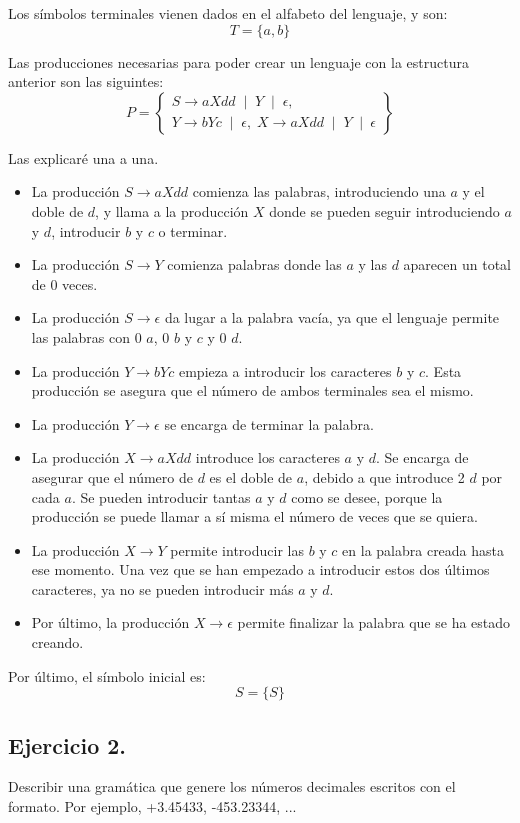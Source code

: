 \documentclass[11pt,a4paper]{article}
\begin{document}
Los símbolos terminales vienen dados en el alfabeto del lenguaje, y son:
	\[T=\{a,b\}\]
	
Las producciones necesarias para poder crear un lenguaje con la estructura anterior son las siguintes:
	\[P=\left\{\begin{array}{c}
		S\rightarrow aXdd \; \mid \; Y \; \mid \; \epsilon,\\
		Y\rightarrow bYc \; \mid \; \epsilon, \; 
		X\rightarrow aXdd \; \mid \; Y \; \mid \: \epsilon 
		\end{array}\right\}\]
		
Las explicaré una a una.
	\begin{itemize}
		\item La producción $S\rightarrow aXdd$ comienza las palabras, introduciendo una $a$ y el doble de $d$, y llama a la producción $X$ donde se pueden seguir introduciendo $a$ y $d$, introducir $b$ y $c$ o terminar.
		\item La producción $S\rightarrow Y$ comienza palabras donde las $a$ y las $d$ aparecen un total de 0 veces.
		\item La producción $S\rightarrow \epsilon$ da lugar a la palabra vacía, ya que el lenguaje permite las palabras con 0 $a$, 0 $b$ y $c$ y 0 $d$.
		\item La producción $Y\rightarrow bYc$ empieza a introducir los caracteres $b$ y $c$. Esta producción se asegura que el número de ambos terminales sea el mismo.
		\item La producción $Y\rightarrow \epsilon$ se encarga de terminar la palabra.
		\item La producción $X\rightarrow aXdd$ introduce los caracteres $a$ y $d$. Se encarga de asegurar que el número de $d$ es el doble de $a$, debido a que introduce 2 $d$ por cada $a$. Se pueden introducir tantas $a$ y $d$ como se desee, porque la producción se puede llamar a sí misma el número de veces que se quiera.
		\item La producción $X\rightarrow Y$ permite introducir las $b$ y $c$ en la palabra creada hasta ese momento. Una vez que se han empezado a introducir estos dos últimos caracteres, ya no se pueden introducir más $a$ y $d$.
		\item Por último, la producción $X\rightarrow \epsilon$ permite finalizar la palabra que se ha estado creando.
	\end{itemize}
	
Por último, el símbolo inicial es:
	\[S=\{S\}\]

\subsection{Ejercicio 2.} Describir una gramática que genere los números decimales escritos con el formato\newline [signo][cifra][punto][cifra]. Por ejemplo, +3.45433, -453.23344, ... \\
\end{document}
